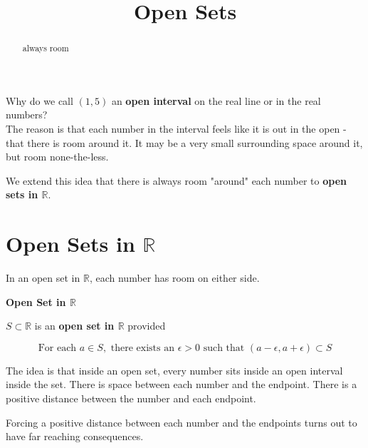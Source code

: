 \documentclass{ximera}
\title{Open Sets}
\begin{document}
\begin{abstract}
always room
\end{abstract}
\maketitle





Why do we call $(1, 5)$ an \textbf{open interval} on the real line or in the real numbers? \\



The reason is that each number in the interval feels like it is out in the open - that there is room around it.  It may be a very small surrounding space around it, but room none-the-less.  


We extend this idea that there is always room "around" each number to \textbf{open sets in $\mathbb{R}$}.






\section{Open Sets in $\mathbb{R}$}

In an open set in $\mathbb{R}$, each number has room on either side.  




\begin{definition}  \textbf{\textcolor{green!50!black}{Open Set in $\mathbb{R}$}}


$S \subset \mathbb{R}$ is an \textbf{open set in $\mathbb{R}$} provided 

\[
\text{For each } a \in S, \text{ there exists an } \epsilon > 0 \text{ such that }  (a - \epsilon, a + \epsilon) \subset S
\]

\end{definition}



\begin{idea}

The idea is that inside an open set, every number sits inside an open interval inside the set.  There is space between each number and the endpoint. There is a positive distance between the number and each endpoint.
\end{idea}

Forcing a positive distance between each number and the endpoints turns out to have far reaching consequences. \\
\end{document}
